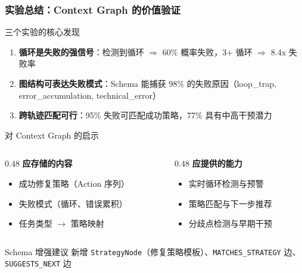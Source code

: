 \documentclass[aspectratio=169,10pt]{beamer}
\begin{document}
\begin{frame}
  \frametitle{实验总结：Context Graph 的价值验证}

  \begin{block}{三个实验的核心发现}
    \begin{enumerate}
      \item \textbf{循环是失败的强信号}：检测到循环 $\Rightarrow$ 60\% 概率失败，3+ 循环 $\Rightarrow$ 8.4x 失败率
      \item \textbf{图结构可表达失败模式}：Schema 能捕获 98\% 的失败原因（loop\_trap, error\_accumulation, technical\_error）
      \item \textbf{跨轨迹匹配可行}：95\% 失败可匹配成功策略，77\% 具有中高干预潜力
    \end{enumerate}
  \end{block}

  \begin{alertblock}{对 Context Graph 的启示}
    \begin{columns}[T]
      \begin{column}{0.48\textwidth}
        \textbf{应存储的内容}
        \begin{itemize}
          \item 成功修复策略（Action 序列）
          \item 失败模式（循环、错误累积）
          \item 任务类型 $\rightarrow$ 策略映射
        \end{itemize}
      \end{column}
      \begin{column}{0.48\textwidth}
        \textbf{应提供的能力}
        \begin{itemize}
          \item 实时循环检测与预警
          \item 策略匹配与下一步推荐
          \item 分歧点检测与早期干预
        \end{itemize}
      \end{column}
    \end{columns}
  \end{alertblock}

  \begin{block}{Schema 增强建议}
    新增 \texttt{StrategyNode}（修复策略模板）、\texttt{MATCHES\_STRATEGY} 边、\texttt{SUGGESTS\_NEXT} 边
  \end{block}
\end{frame}

\end{document}

